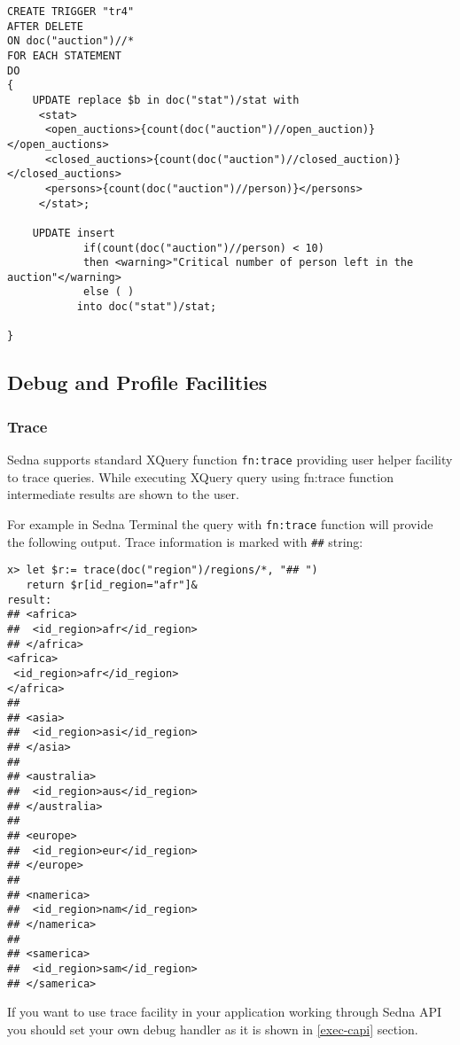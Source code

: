 \documentclass[a4paper,12pt]{article}
\begin{document}
\begin{verbatim}
CREATE TRIGGER "tr4"
AFTER DELETE
ON doc("auction")//*
FOR EACH STATEMENT
DO
{
	UPDATE replace $b in doc("stat")/stat with
	 <stat>
	  <open_auctions>{count(doc("auction")//open_auction)}</open_auctions>
	  <closed_auctions>{count(doc("auction")//closed_auction)}</closed_auctions>
	  <persons>{count(doc("auction")//person)}</persons>
	 </stat>;

	UPDATE insert
	        if(count(doc("auction")//person) < 10)
	        then <warning>"Critical number of person left in the auction"</warning>
	        else ( )
	       into doc("stat")/stat;

}
\end{verbatim}


\subsection{Debug and Profile Facilities}
\subsubsection{Trace}
\label{trace}
Sedna supports standard XQuery function \verb!fn:trace! \cite{paper:query-fo} providing user helper facility to trace queries. While executing XQuery query using fn:trace function intermediate results are shown to the user.

For example in Sedna Terminal the query with \verb!fn:trace! function will provide the following output. Trace information is marked with \verb!##! string:

\begin{verbatim}
x> let $r:= trace(doc("region")/regions/*, "## ")
   return $r[id_region="afr"]&
result:
## <africa>
##  <id_region>afr</id_region>
## </africa>
<africa>
 <id_region>afr</id_region>
</africa>
##
## <asia>
##  <id_region>asi</id_region>
## </asia>
##
## <australia>
##  <id_region>aus</id_region>
## </australia>
##
## <europe>
##  <id_region>eur</id_region>
## </europe>
##
## <namerica>
##  <id_region>nam</id_region>
## </namerica>
##
## <samerica>
##  <id_region>sam</id_region>
## </samerica>
\end{verbatim}

If you want to use trace facility in your application working through Sedna API you should set your own debug handler as it is shown in \ref{exec-capi} section.
\end{document}
